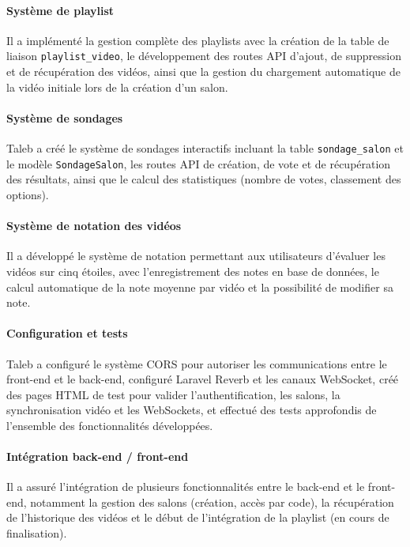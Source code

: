 \documentclass[12pt,a4paper]{report}
\begin{document}
\paragraph{Système de playlist}
Il a implémenté la gestion complète des playlists avec la création de la table de liaison \texttt{playlist\_video}, le développement des routes API d'ajout, de suppression et de récupération des vidéos, ainsi que la gestion du chargement automatique de la vidéo initiale lors de la création d'un salon.

\paragraph{Système de sondages}
Taleb a créé le système de sondages interactifs incluant la table \texttt{sondage\_salon} et le modèle \texttt{SondageSalon}, les routes API de création, de vote et de récupération des résultats, ainsi que le calcul des statistiques (nombre de votes, classement des options).

\paragraph{Système de notation des vidéos}
Il a développé le système de notation permettant aux utilisateurs d'évaluer les vidéos sur cinq étoiles, avec l'enregistrement des notes en base de données, le calcul automatique de la note moyenne par vidéo et la possibilité de modifier sa note.

\paragraph{Configuration et tests}
Taleb a configuré le système CORS pour autoriser les communications entre le front-end et le back-end, configuré Laravel Reverb et les canaux WebSocket, créé des pages HTML de test pour valider l'authentification, les salons, la synchronisation vidéo et les WebSockets, et effectué des tests approfondis de l'ensemble des fonctionnalités développées.

\paragraph{Intégration back-end / front-end}
Il a assuré l'intégration de plusieurs fonctionnalités entre le back-end et le front-end, notamment la gestion des salons (création, accès par code), la récupération de l'historique des vidéos et le début de l'intégration de la playlist (en cours de finalisation).
\end{document}
